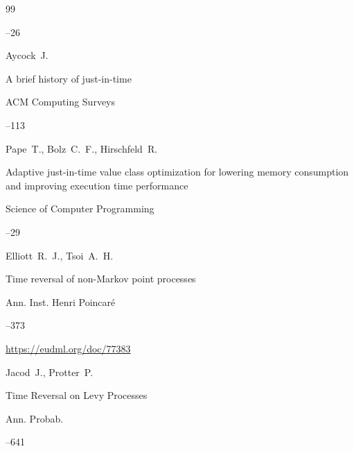 \begin{thebibliography}{99}

--26





\by Aycock~J.

\paper  A brief history of just-in-time

\jour ACM Computing Surveys



--113 






\by Pape~T., Bolz~C.~F., Hirschfeld~R.


\paper Adaptive just-in-time value class optimization for lowering memory consumption and improving execution time performance

\jour Science of Computer Programming


--29





\by Elliott~R.~J., Tsoi~A.~H.

\paper Time reversal of non-Markov point processes

\jour Ann.  Inst.  Henri  Poincar\'e




--373

\elink \url{https://eudml.org/doc/77383}




\by Jacod~J., Protter~P.

\paper Time Reversal on Levy Processes

\jour Ann. Probab.



–641 






\end{thebibliography}
